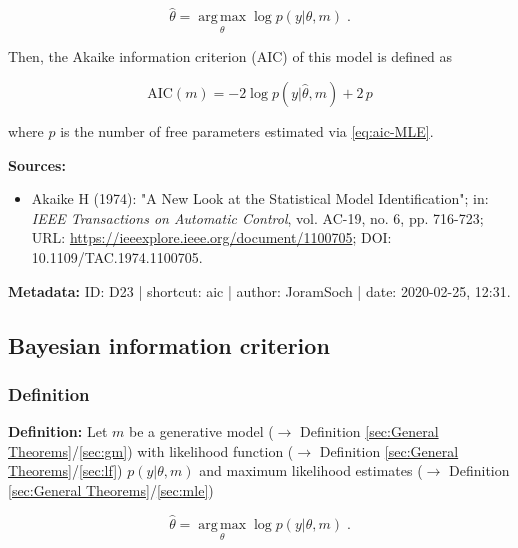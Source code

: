 \documentclass[a4paper,12pt,twoside]{book}
\begin{document}
\begin{equation} \label{eq:aic-MLE}
\hat{\theta} = \operatorname*{arg\,max}_\theta \log p(y | \theta, m) \; .
\end{equation}

Then, the Akaike information criterion (AIC) of this model is defined as

\begin{equation} \label{eq:aic-AIC}
\mathrm{AIC}(m) = -2 \log p(y | \hat{\theta}, m) + 2 \, p
\end{equation}

where $p$ is the number of free parameters estimated via \eqref{eq:aic-MLE}.


\vspace{1em}
\textbf{Sources:}
\begin{itemize}
\item Akaike H (1974): "A New Look at the Statistical Model Identification"; in: \textit{IEEE Transactions on Automatic Control}, vol. AC-19, no. 6, pp. 716-723; URL: \url{https://ieeexplore.ieee.org/document/1100705}; DOI: 10.1109/TAC.1974.1100705.
\end{itemize}


\vspace{1em}
\textbf{Metadata:} ID: D23 | shortcut: aic | author: JoramSoch | date: 2020-02-25, 12:31.
\vspace{1em}



\subsection{Bayesian information criterion}

\subsubsection[\textit{Definition}]{Definition} \label{sec:bic}
\setcounter{equation}{0}

\textbf{Definition:} Let $m$ be a generative model ($\rightarrow$ Definition \ref{sec:General Theorems}/\ref{sec:gm}) with likelihood function ($\rightarrow$ Definition \ref{sec:General Theorems}/\ref{sec:lf}) $p(y \vert \theta, m)$ and maximum likelihood estimates ($\rightarrow$ Definition \ref{sec:General Theorems}/\ref{sec:mle})

\begin{equation} \label{eq:bic-MLE}
\hat{\theta} = \operatorname*{arg\,max}_\theta \log p(y | \theta, m) \; .
\end{equation}
\end{document}
